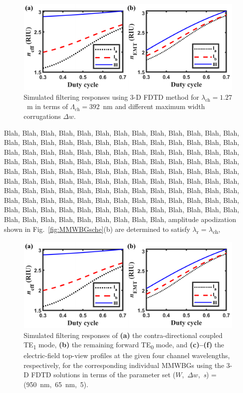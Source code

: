 \documentclass[lettersize,journal]{IEEEtran}
\def\SB#1{\textsubscript{#1}}
\def\mum{\textmu m }
\def\ur#1{{\color{ured}#1}}
\def\rur#1{{\color{rured}#1}}
\begin{document}
    \begin{figure}[!t]
		\includegraphics{Fig_sample.pdf}
		\centering
		\caption{\label{fig:MMWBGdelw}Simulated filtering responses using 3-D FDTD method 
                for $\lambda_\text{ch} = 1.27$~\mum in terms of 
                $\Lambda_\text{ch} = 392$~nm and different maximum width corrugations $\Delta w$.}
	\end{figure}
    Blah, Blah, Blah, Blah, Blah, Blah, Blah, Blah, Blah, Blah, Blah, Blah, Blah, Blah, Blah, Blah, Blah, Blah, 
    Blah, Blah, Blah, Blah, Blah, Blah, Blah, Blah, Blah, Blah, Blah, Blah, Blah, Blah, Blah, Blah, Blah, Blah, 
    Blah, Blah, Blah, Blah, Blah, Blah, Blah, Blah, Blah, Blah, Blah, Blah, Blah, Blah, Blah, Blah, Blah, Blah, 
    Blah, Blah, Blah, Blah, Blah, Blah, Blah, Blah, Blah, Blah, Blah, Blah, Blah, Blah, Blah, Blah, Blah, Blah, 
    Blah, Blah, Blah, Blah, Blah, Blah, Blah, Blah, Blah, Blah, Blah, Blah, Blah, Blah, Blah, Blah, Blah, Blah, 
    Blah, Blah, Blah, Blah, Blah, Blah, Blah, Blah, Blah, Blah, Blah, Blah, Blah, Blah, Blah, Blah, Blah, Blah, 
    Blah, Blah, Blah, Blah, Blah, Blah, Blah, Blah, Blah, Blah, Blah, Blah, Blah, Blah, Blah, Blah, Blah, Blah, 
    amplitude apodization shown in Fig.~\ref{fig:MMWBGsche}(b) are \ur{determined} to \ur{satisfy} 
    $\lambda$\SB{r} = $\lambda$\SB{ch}, 
    \begin{figure}[!t]
		\includegraphics{Fig_sample.pdf}
		\centering
		\caption{\label{fig:MMWBGs}Simulated filtering responses 
                \rur{of \textbf{(a)} the contra-directional coupled TE\SB{1} mode, 
                \textbf{(b)} the remaining forward TE\SB{0} mode, and 
                \textbf{(c)--(f)} the} electric-field top-view profiles at the given four channel     
                wavelengths, respectively, 
                for the corresponding \rur{individual} MMWBGs using the 3-D FDTD solutions in terms of 
                the parameter set ($W$,~$\Delta w$,~\textit{s}) = (950~nm,~65~nm,~5).}
	\end{figure}
\end{document}
